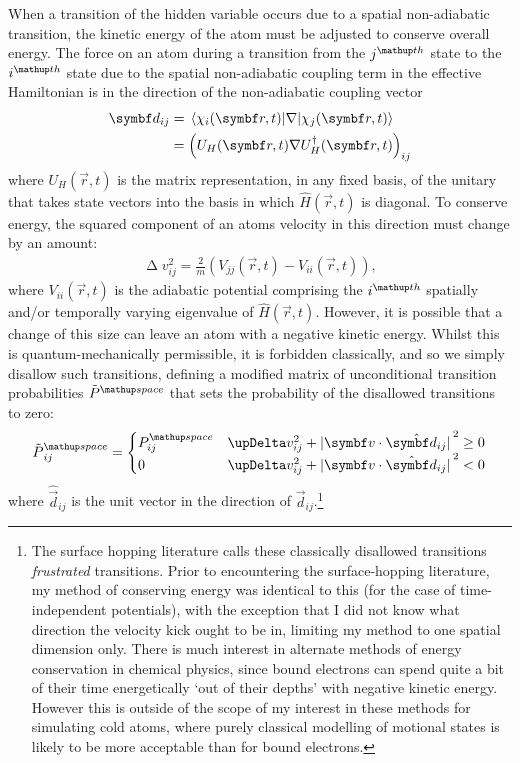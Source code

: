 When a transition of the hidden variable occurs due to a spatial non-adiabatic transition, the kinetic energy of the atom must be adjusted to conserve overall energy. The force on an atom during a transition from the $j^\up{th}$ state to the $i^\up{th}$ state due to the spatial non-adiabatic coupling term in the effective Hamiltonian is in the direction of the non-adiabatic coupling vector~\cite{doi:10.1146/annurev-physchem-040215-112245}
\begin{align}
\vec d_{ij} &= \matrixel{\chi_i(\vec r, t)}{\nabla}{\chi_j(\vec r, t)}\\
&= \left(U_H(\vec r, t)\nabla U_H^\dagger(\vec r, t)\right)_{ij}
\end{align}
where $U_H(\vec r, t)$ is the matrix representation, in any fixed basis, of the unitary that takes state vectors into the basis in which $\hat H(\vec r, t)$ is diagonal. To conserve energy, the squared component of an atoms velocity in this direction must change by an amount:
\begin{align}
\upDelta v_{ij}^2 = \frac2m\left(V_{jj}(\vec r, t) - V_{ii}(\vec r, t)\right),
\end{align}
where $V_{ii}(\vec r, t)$ is the adiabatic potential comprising the $i^\up{th}$ spatially and/or temporally varying eigenvalue of $\hat H(\vec r, t)$. However, it is possible that a change of this size can leave an atom with a negative kinetic energy. Whilst this is quantum-mechanically permissible, it is forbidden classically, and so we simply disallow such transitions, defining a modified matrix of unconditional transition probabilities $\tilde P^\up{space}$ that sets the probability of the disallowed transitions to zero:
\begin{align}
\tilde P^\up{space}_{ij} =
\begin{cases}
P^\up{space}_{ij} & \upDelta v_{ij}^2 + \abs{\vec v\cdot\hat{\vec d_{ij}}}^2 \geq 0 \\
0 & \upDelta v_{ij}^2 + \abs{\vec v\cdot\hat{\vec d}_{ij}}^2 < 0
\end{cases}
\end{align}
where $\hat{\vec d}_{ij}$ is the unit vector in the direction of $\vec d_{ij}$.\footnote{The surface hopping literature calls these classically disallowed transitions \emph{frustrated} transitions. Prior to encountering the surface-hopping literature, my method of conserving energy was identical to this (for the case of time-independent potentials), with the exception that I did not know what direction the velocity kick ought to be in, limiting my method to one spatial dimension only. There is much interest in alternate methods of energy conservation in chemical physics, since bound electrons can spend quite a bit of their time energetically `out of their depths' with negative kinetic energy. However this is outside of the scope of my interest in these methods for simulating cold atoms, where purely classical modelling of motional states is likely to be more acceptable than for bound electrons.}

